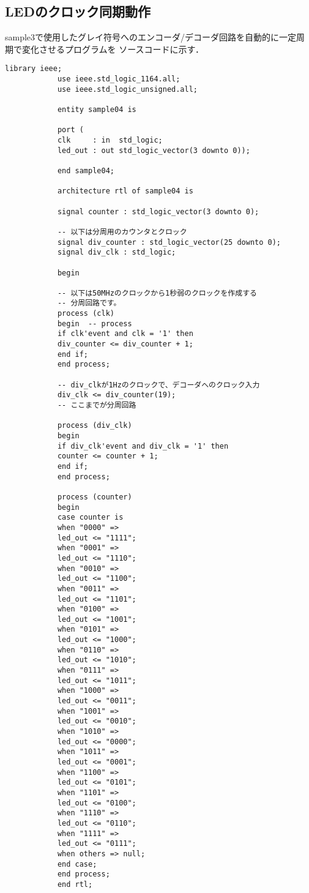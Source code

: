 \documentclass{ltjsarticle}
\begin{document}
	\subsection{LEDのクロック同期動作}
		sample3で使用したグレイ符号へのエンコーダ/デコーダ回路を自動的に一定周期で変化させるプログラムを
		ソースコードに示す．
		\begin{lstlisting}[caption=sample4, label=code:sample4]
			library ieee;
			use ieee.std_logic_1164.all;
			use ieee.std_logic_unsigned.all;

			entity sample04 is

			port (
			clk     : in  std_logic;
			led_out : out std_logic_vector(3 downto 0));

			end sample04;

			architecture rtl of sample04 is

			signal counter : std_logic_vector(3 downto 0);

			-- 以下は分周用のカウンタとクロック
			signal div_counter : std_logic_vector(25 downto 0);
			signal div_clk : std_logic;

			begin

			-- 以下は50MHzのクロックから1秒弱のクロックを作成する
			-- 分周回路です。
			process (clk)
			begin  -- process
			if clk'event and clk = '1' then
			div_counter <= div_counter + 1;
			end if;
			end process;

			-- div_clkが1Hzのクロックで、デコーダへのクロック入力
			div_clk <= div_counter(19);
			-- ここまでが分周回路

			process (div_clk)
			begin
			if div_clk'event and div_clk = '1' then
			counter <= counter + 1;
			end if;
			end process;

			process (counter)
			begin
			case counter is
			when "0000" =>
			led_out <= "1111";
			when "0001" =>
			led_out <= "1110";
			when "0010" =>
			led_out <= "1100";
			when "0011" =>
			led_out <= "1101";
			when "0100" =>
			led_out <= "1001";
			when "0101" =>
			led_out <= "1000";
			when "0110" =>
			led_out <= "1010";
			when "0111" =>
			led_out <= "1011";
			when "1000" =>
			led_out <= "0011";
			when "1001" =>
			led_out <= "0010";
			when "1010" =>
			led_out <= "0000";
			when "1011" =>
			led_out <= "0001";
			when "1100" =>
			led_out <= "0101";
			when "1101" =>
			led_out <= "0100";
			when "1110" =>
			led_out <= "0110";
			when "1111" =>
			led_out <= "0111";
			when others => null;
			end case;
			end process;
			end rtl;
		\end{lstlisting}
\end{document}
